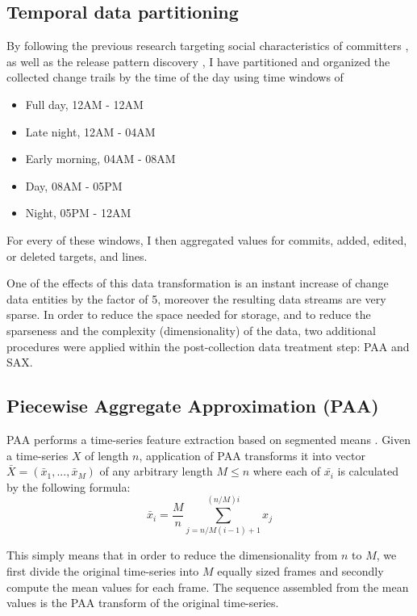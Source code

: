 \documentclass[conference]{worldcomp}
\begin{document}
\subsection{Temporal data partitioning} \label{partitioning}
By following the previous research targeting social characteristics of committers \cite{citeulike:10392277}, 
as well as the release pattern discovery \cite{citeulike:10377366}, I have partitioned and organized 
the collected change trails by the time of the day using time windows of
\begin{itemize}
    \item Full day, 12AM - 12AM
    \item Late night, 12AM - 04AM  
    \item Early morning, 04AM - 08AM  
    \item Day, 08AM - 05PM  
    \item Night, 05PM - 12AM
\end{itemize}
For every of these windows, I then aggregated values for commits, added, edited, or deleted 
targets, and lines. 

One of the effects of this data transformation is an instant increase of change data 
entities by the factor of 5, moreover the resulting data streams are very sparse. 
In order to reduce the space needed for storage, and to reduce the sparseness and the 
complexity (dimensionality) of the data, two additional procedures were applied within 
the post-collection data treatment step: PAA and SAX.

\subsection{Piecewise Aggregate Approximation (PAA)} \label{paa}
PAA performs a time-series feature extraction based on segmented means \cite{citeulike:2946589}. 
Given a time-series $X$ 
of length $n$, application of PAA transforms it into vector $\bar{X} = ( \bar{x}_{1}, ..., \bar{x}_{M} )$ of 
any arbitrary length $M \leq n$ where each of $\bar{x_{i}}$ is calculated by the following formula:
\begin{equation}
\bar{x}_{i} = \frac{M}{n} \sum_{j=n/M(i-1)+1}^{(n/M)i} x_{j}
\label{eq:paa}
\end{equation}

This simply means that in order to reduce the dimensionality from $n$ to $M$, 
we first divide the original time-series into $M$ equally sized frames and secondly compute the mean 
values for each frame. The sequence assembled from the mean values is the PAA transform of 
the original time-series. 
\end{document}
